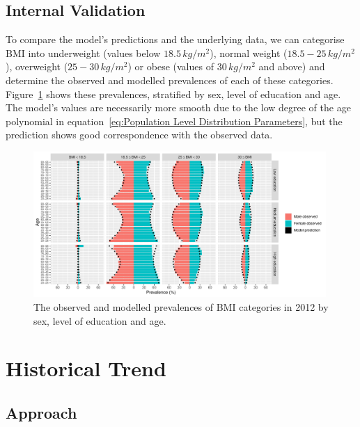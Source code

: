 \documentclass{imammb}
\numberwithin{equation}{section}
\begin{document}
\subsection{Internal Validation}
\label{sec:Population Level Distribution/Internal Validation}

To compare the model's predictions and the underlying data, we can categorise BMI into underweight (values below $18.5 \, kg / m^2$), normal weight ($18.5 - 25 \, kg / m^2$), overweight ($25 - 30 \, kg / m^2$) or obese (values of $30 \, kg / m^2$ and above) and determine the observed and modelled prevalences of each of these categories. Figure~\ref{fig:Population Level Prevalences} shows these prevalences, stratified by sex, level of education and age. The model's values are necessarily more smooth due to the low degree of the age polynomial in equation~\ref{eq:Population Level Distribution Parameters}, but the prediction shows good correspondence with the observed data.

\vspace{-3mm}

\begin{figure}[h]
\centering
\includegraphics[width=0.99\textwidth] {"Figures/Population-Level-Prevalences.pdf"}
\caption{The observed and modelled prevalences of BMI categories in 2012 by sex, level of education and age.}
\label{fig:Population Level Prevalences}
\vspace*{-9pt}
\end{figure}

\section{Historical Trend}
\label{sec:Historical Trend}

\subsection{Approach}
\label{sec:Historical Trend/Approach}
\end{document}
